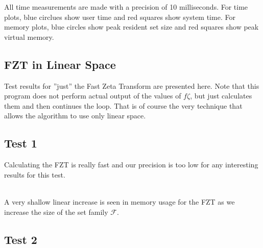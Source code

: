 \documentclass[a4paper, titlepage]{article}
\begin{document}
All time measurements are made with a precision of 10 milliseconds. For time plots, blue circlues show user time and red squares show system time. For memory plots, blue circles show peak resident set size and red squares show peak virtual memory.

\subsection{FZT in Linear Space}
Test results for ''just'' the Fast Zeta Transform are presented here. Note that this program does not perform actual output of the values of $f\zeta$, but just calculates them and then continues the loop. That is of course the very technique that allows the algorithm to use only linear space.

\subsection*{Test 1}


Calculating the FZT is really fast and our precision is too low for any interesting results for this test.
\\\\

A very shallow linear increase is seen in memory usage for the FZT as we increase the size of the set family $\mathcal{F}$.

\subsection*{Test 2}

\end{document}
